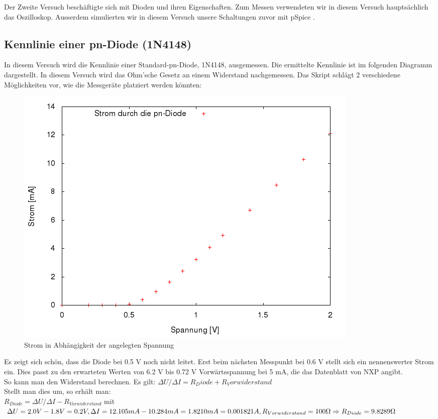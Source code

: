 

\setcounter{section}{2}
Der Zweite Versuch beschäftigte sich mit Dioden und ihren Eigenschaften. Zum Messen verwendeten wir in diesem Versuch hauptsächlich das Oszilloskop. Ausserdem simulierten wir in diesem Versuch unsere Schaltungen zuvor mit pSpice \cite{spice}.

\subsection{Kennlinie einer pn-Diode (1N4148)}
In diesem Versuch wird die Kennlinie einer Standard-pn-Diode, 1N4148, ausgemessen. Die ermittelte Kennlinie ist im folgenden Diagramm dargestellt.
In diesem Versuch wird das Ohm'sche Gesetz an einem Widerstand nachgemessen.
Das Skript schlägt 2 verschiedene Möglichkeiten vor, wie die Messgeräte platziert werden könnten:
\begin{figure}[H]
	\centering
	\includegraphics[width=\linewidth]{versuch2/versuch_2_1.png}
	\caption{Strom in Abhängigkeit der angelegten Spannung}
\end{figure}
Es zeigt sich schön, dass die Diode bei 0.5 V noch nicht leitet. Erst beim nächsten Messpunkt bei 0.6 V stellt sich ein nennenswerter Strom ein. Dies passt zu den erwarteten Werten von 6.2 V bis 0.72 V Vorwärtsspannung bei 5 mA, die das Datenblatt von NXP angibt.\\
So kann man den Widerstand berechnen. Es gilt: $\Delta U / \Delta I = R_Diode + R_Vorwiderstand$\\
Stellt man dies um, so erhält man:\\
$R_{Diode} = \Delta U / \Delta I - R_{Vorwiderstand} $ mit $\Delta U = 2.0V-1.8V=0.2V, \Delta I = 12.105mA-10.284mA=1.8210mA=0.001821A, R_{Vorwiderstand}=100\Omega \\ \Rightarrow R_{Diode} = 9.8289 \Omega$\\\\

